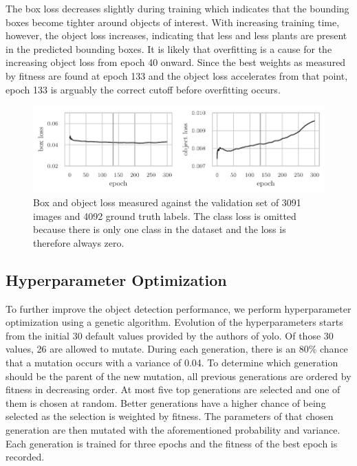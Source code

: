 \documentclass[draft,final]{vutinfth} %
\begin{document}
The box loss decreases slightly during training which indicates that
the bounding boxes become tighter around objects of interest. With
increasing training time, however, the object loss increases,
indicating that less and less plants are present in the predicted
bounding boxes. It is likely that overfitting is a cause for the
increasing object loss from epoch \num{40} onward. Since the best
weights as measured by fitness are found at epoch \num{133} and the
object loss accelerates from that point, epoch \num{133} is arguably
the correct cutoff before overfitting occurs.

\begin{figure}
  \centering
  \includegraphics{graphics/val_box_obj_loss.pdf}
  \caption[Object detection box and object loss.]{Box and object loss
    measured against the validation set of \num{3091} images and
    \num{4092} ground truth labels. The class loss is omitted because
    there is only one class in the dataset and the loss is therefore
    always zero.}
  \label{fig:box-obj-loss}
\end{figure}

\subsection{Hyperparameter Optimization}
\label{ssec:obj-hypopt}

To further improve the object detection performance, we perform
hyperparameter optimization using a genetic algorithm. Evolution of
the hyperparameters starts from the initial \num{30} default values
provided by the authors of \gls{yolo}. Of those \num{30} values,
\num{26} are allowed to mutate. During each generation, there is an
80\% chance that a mutation occurs with a variance of \num{0.04}. To
determine which generation should be the parent of the new mutation,
all previous generations are ordered by fitness in decreasing
order. At most five top generations are selected and one of them is
chosen at random. Better generations have a higher chance of being
selected as the selection is weighted by fitness. The parameters of
that chosen generation are then mutated with the aforementioned
probability and variance. Each generation is trained for three epochs
and the fitness of the best epoch is recorded.
\end{document}
